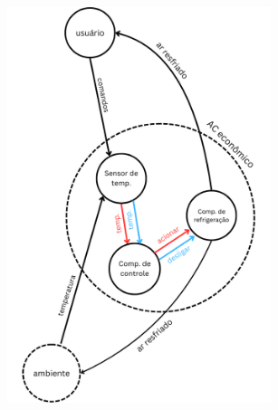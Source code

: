 \documentclass{article}
\begin{document}
\begin{enumerate}
    \begin{figure}[!h]
        \centering
        \includegraphics[width=7.7cm]{FIG/arcondicionado2.png}
    \end{figure}
\end{enumerate}\vspace{0.5cm}
\end{document}
